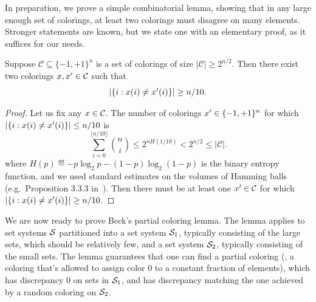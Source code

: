 In preparation, we prove a simple combinatorial lemma, showing that in
any large enough set of colorings, at least two colorings must
disagree on many elements. Stronger statements are known, but we state
one with an elementary proof, as it suffices for our needs.

\begin{lemma}\label{lm:ch3-hamming}
  Suppose \(\mathcal{C} \subseteq \{-1,+1\}^n\) is a set of colorings
  of size \(|\mathcal{C}| \ge 2^{n/2}\). Then there exist two colorings
  \(x,x' \in \mathcal{C}\) such that
  \[
    |\{i: x(i) \neq x'(i)\}| \ge n/10.
  \]
\end{lemma}
\begin{proof}
  Let us fix any $x \in \mathcal{C}$. The
  number of colorings \(x'\in \{-1,+1\}^n\) for which \(|\{i
  : x(i) \neq x'(i)\}| \le n/10\) is
  \[
    \sum_{i = 0}^{\lfloor n/10\rfloor} {n \choose i}
    \le
    2^{n H(1/10)} < 2^{n/2} \le |\mathcal{C}|.
  \]
  where \(H(p) \eqdef -p \log_2 p - (1-p)\log_2(1-p)\) is the binary
  entropy function, and we used standard estimates on the volumes of
  Hamming balls (e.g.~Proposition 3.3.3 in~\cite{guruswami2012essential}).
  Then there must be at least one $x' \in \mathcal{C}$
  for which $|\{i: x(i) \neq x'(i)\}| \ge
  n/10$.
\end{proof}

We are now ready to prove Beck's partial coloring lemma. The lemma applies to set systems $\mathcal{S}$ partitioned into a set system $\mathcal{S}_1$, typically consisting of the large sets, which should be relatively few, and a set system $\mathcal{S}_2$, typically consisting of the small sets. The lemma guarantees that one can find a partial coloring (\ie, a coloring that's allowed to assign color $0$ to a constant fraction of elements), which has discrepancy $0$ on sets in $\mathcal{S}_1$, and has discrepancy matching the one achieved by a random coloring on $\mathcal{S}_2$.

